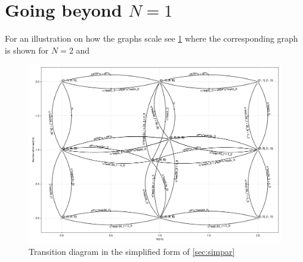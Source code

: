 \documentclass[11pt]{article}
\begin{document}

\section{Going beyond $N=1$}
For an illustration on how the graphs scale see \cref{fig:N2trans} where the corresponding graph is shown for $N=2$ and 

\begin{figure}[H]
    \includegraphics[width=\textwidth]{../../plots/simple_sg_B=1_C=2_N=2_version=2.5.png}
    \caption{
        Transition diagram in the simplified form of \cref{sec:simpar}
    }\label{fig:N2trans}
\end{figure}
\end{document}
